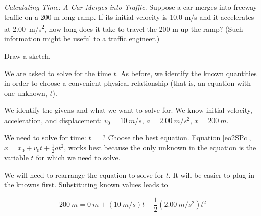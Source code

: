\documentclass[dvipsnames]{article}
\begin{document}
\begin{example}
    \textit{Calculating Time: A Car Merges into Traffic}. Suppose a car merges into freeway traffic on a 200-m-long ramp. If its initial velocity is 10.0 m/s and it accelerates at \SI{2.00}{m/s^2}, how long does it take to travel the 200 m up the ramp? (Such information might be useful to a traffic engineer.)
\end{example}

\Solution Draw a sketch.

\begin{center}
\end{center}

We are asked to solve for the time $t$. As before, we identify the known quantities in order to choose a convenient physical relationship (that is, an equation with one unknown, $t$).

\vspace{1em}

We identify the givens and what we want to solve for. We know initial velocity, acceleration, and displacement: $v_0 = \SI{10}{m/s}$, $a = \SI{2.00}{m/s^2}$, $x = \SI{200}{m}$. 

\vspace{1em}

We need to solve for time: $t =\ ?$ Choose the best equation. Equation \eqref{eo2SPc}, $x = x_0 + v_0 t + \frac{1}{2} a t^2$, works best because the only unknown in the equation is the variable $t$ for which we need to solve.

\vspace{1em}

We will need to rearrange the equation to solve for $t$. It will be easier to plug in the knowns first. Substituting known values leads to 

\begin{equation*}
    \SI{200}{m} = \SI{0}{m} + \left(\SI{10}{m/s}\right) t + \frac{1}{2}\left(\SI{2.00}{m/s^2}\right) t^2
\end{equation*}
\end{document}
